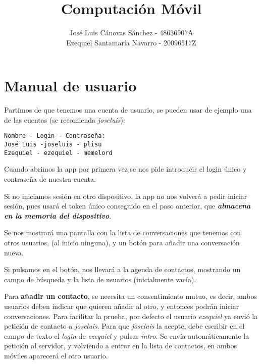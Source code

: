\documentclass[]{article}
\title{Computación Móvil}
\author{José Luis Cánovas Sánchez - 48636907A\\Ezequiel Santamaría Navarro - 20096517Z}
\begin{document}
\maketitle


\tableofcontents

\section{Manual de usuario}

Partimos de que tenemos una cuenta de usuario, se pueden usar de ejemplo una de las cuentas (se recomienda \textit{joseluis}):

\begin{verbatim}
Nombre - Login - Contraseña:
José Luis -joseluis - plisu
Ezequiel - ezequiel - memelord
\end{verbatim}

Cuando abrimos la app por primera vez se nos pide introducir el login único y contraseña de nuestra cuenta.


\hfill

Si no iniciamos sesión en otro dispositivo, la app no nos volverá a pedir iniciar sesión, pues usará el token único conseguido en el paso anterior, que \textit{\textbf{almacena en la memoria del dispositivo}}.

\hfill

Se nos mostrará una pantalla con la lista de conversaciones que tenemos con otros usuarios, (al inicio ninguna), y un botón para añadir una conversación nueva.


\hfill


Si pulsamos en el botón, nos llevará a la agenda de contactos, mostrando un campo de búsqueda y la lista de usuarios (inicialmente vacía).

Para \textbf{añadir un contacto}, se necesita un consentimiento mutuo, es decir, ambos usuarios deben indicar que quieren añadir al otro, y entonces podrán iniciar conversaciones. Para facilitar la prueba, por defecto el usuario \textit{ezequiel} ya envió la petición de contacto a \textit{joseluis}. Para que \textit{joseluis} la acepte, debe escribir en el campo de texto el \textit{login} de \textit{ezequiel} y pulsar \textit{intro}. Se envía automáticamente la petición al servidor, y volviendo a entrar en la lista de contactos, en ambos móviles aparecerá el otro usuario.
\end{document}
